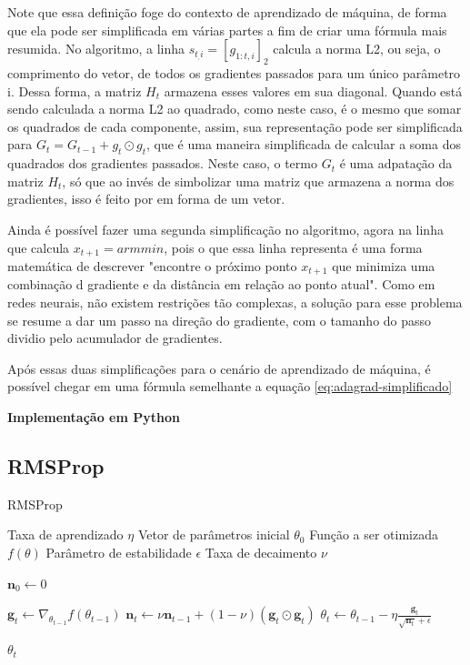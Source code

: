 Note que essa definição foge do contexto de aprendizado de máquina, de forma que ela pode ser simplificada em várias partes a fim de criar uma fórmula mais resumida. No algoritmo, a linha $s_{t_,i} = [g_{1:t,i}]_2$ calcula a norma L2, ou seja, o comprimento do vetor, de todos os gradientes passados para um único parâmetro i. Dessa forma, a matriz $H_t$ armazena esses valores em sua diagonal. Quando está sendo calculada a norma L2 ao quadrado, como neste caso, é o mesmo que somar os quadrados de cada componente, assim, sua representação pode ser simplificada para $G_t = G_{t-1} + g_t \odot g_t$, que é uma maneira simplificada de calcular a soma dos quadrados dos gradientes passados. Neste caso, o termo $G_t$ é uma adpatação da matriz $H_t$, só que ao invés de simbolizar uma matriz que armazena a norma dos gradientes, isso é feito por em forma de um vetor.

Ainda é possível fazer uma segunda simplificação no algoritmo, agora na linha que calcula $x_{t+1} = armmin{}$, pois o que essa linha representa é uma forma matemática de descrever "encontre o próximo ponto $x_{t+1}$ que minimiza uma combinação d gradiente e da distância em relação ao ponto atual". Como em redes neurais, não existem restrições tão complexas, a solução para esse problema se resume a dar um passo na direção do gradiente, com o tamanho do passo dividio pelo acumulador de gradientes.

Após essas duas simplificações para o cenário de aprendizado de máquina, é possível chegar em uma fórmula semelhante a equação \ref{eq:adagrad-simplificado}


\textbf{Implementação em Python}

\subsection{RMSProp}

\begin{algorithm}[H] %
    \caption{RMSProp}
    \label{alg:rmsprop}
    \begin{algorithmic}[1] %

    \Require Taxa de aprendizado $\eta$
    \Require Vetor de parâmetros inicial $\theta_0$
    \Require Função a ser otimizada $f(\theta)$
    \Require Parâmetro de estabilidade $\epsilon$
    \Require Taxa de decaimento $\nu$

    \State $\mathbf{n}_0 \leftarrow 0$ 

        \State $\textbf{g}_t \leftarrow \nabla_{\theta_{t-1}} f(\theta_{t-1})$
        \State $\textbf{n}_t \leftarrow \nu \textbf{n}_{t-1} + (1 - \nu) (\mathbf{g}_t \odot \mathbf{g}_t)$
        \State $\theta_t \leftarrow \theta_{t-1} - \eta \frac{\textbf{g}_t}{\sqrt{\textbf{n}_t} + \epsilon}$
    \EndWhile

    \State \Return $\theta_t$ 
    \end{algorithmic}
\end{algorithm}



